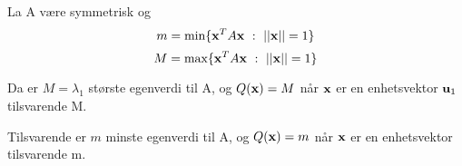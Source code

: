 La A være symmetrisk og
$$m = \text{min}\{\mathbf{x}^TA\mathbf{x}\ :\ ||\mathbf{x}||=1\}$$
$$M = \text{max}\{\mathbf{x}^TA\mathbf{x}\ :\ ||\mathbf{x}||=1\}$$

Da er $M = \lambda_1$ største egenverdi til A,
og $Q(\mathbf{x})=M$ når $\mathbf{x}$ er en enhetsvektor $\mathbf{u}_1$ tilsvarende M.

Tilsvarende er $m$ minste egenverdi til A,
og $Q(\mathbf{x})=m$ når $\mathbf{x}$ er en enhetsvektor tilsvarende m.
